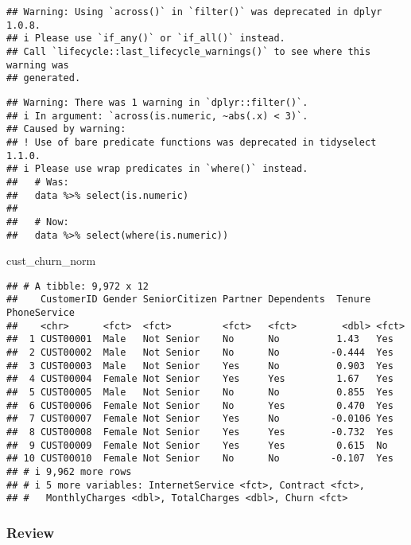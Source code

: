 \documentclass[
]{article}
\newenvironment{Shaded}{\begin{snugshade}}{\end{snugshade}}
\newcommand{\NormalTok}[1]{#1}
\begin{document}
\begin{verbatim}
## Warning: Using `across()` in `filter()` was deprecated in dplyr 1.0.8.
## i Please use `if_any()` or `if_all()` instead.
## Call `lifecycle::last_lifecycle_warnings()` to see where this warning was
## generated.
\end{verbatim}

\begin{verbatim}
## Warning: There was 1 warning in `dplyr::filter()`.
## i In argument: `across(is.numeric, ~abs(.x) < 3)`.
## Caused by warning:
## ! Use of bare predicate functions was deprecated in tidyselect 1.1.0.
## i Please use wrap predicates in `where()` instead.
##   # Was:
##   data %>% select(is.numeric)
## 
##   # Now:
##   data %>% select(where(is.numeric))
\end{verbatim}

\begin{Shaded}
\begin{Highlighting}[]
\NormalTok{cust\_churn\_norm}
\end{Highlighting}
\end{Shaded}

\begin{verbatim}
## # A tibble: 9,972 x 12
##    CustomerID Gender SeniorCitizen Partner Dependents  Tenure PhoneService
##    <chr>      <fct>  <fct>         <fct>   <fct>        <dbl> <fct>       
##  1 CUST00001  Male   Not Senior    No      No          1.43   Yes         
##  2 CUST00002  Male   Not Senior    No      No         -0.444  Yes         
##  3 CUST00003  Male   Not Senior    Yes     No          0.903  Yes         
##  4 CUST00004  Female Not Senior    Yes     Yes         1.67   Yes         
##  5 CUST00005  Male   Not Senior    No      No          0.855  Yes         
##  6 CUST00006  Female Not Senior    No      Yes         0.470  Yes         
##  7 CUST00007  Female Not Senior    Yes     No         -0.0106 Yes         
##  8 CUST00008  Female Not Senior    Yes     Yes        -0.732  Yes         
##  9 CUST00009  Female Not Senior    Yes     Yes         0.615  No          
## 10 CUST00010  Female Not Senior    No      No         -0.107  Yes         
## # i 9,962 more rows
## # i 5 more variables: InternetService <fct>, Contract <fct>,
## #   MonthlyCharges <dbl>, TotalCharges <dbl>, Churn <fct>
\end{verbatim}

\subsubsection{Review}\label{review}
\end{document}
